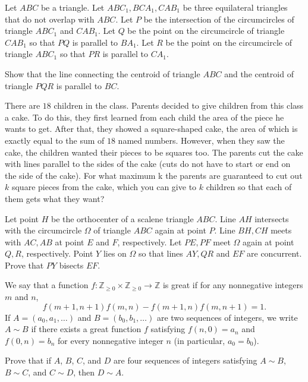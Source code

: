 \documentclass[11pt]{scrartcl}
\begin{document}
\begin{problem}[748616641641895]
Let $ABC$ be a triangle. Let $ABC_1, BCA_1, CAB_1$ be three equilateral triangles that do not overlap with $ABC$.
Let $P$ be the intersection of the circumcircles of triangle $ABC_1$ and $CAB_1$.
Let $Q$ be the point on the circumcircle of triangle $CAB_1$ so that $PQ$ is parallel to $BA_1$. Let $R$ be the point on the circumcircle of triangle $ABC_1$ so that $PR$ is parallel to $CA_1$.

Show that the line connecting the centroid of triangle $ABC$ and the centroid of triangle $PQR$ is parallel to $BC$.
\end{problem}
\begin{problem}[208479683430579745]
	There are $18$ children in the class. Parents decided to give children from this class a cake. To do this, they first learned from each child the area of the piece he wants to get. After that, they showed a square-shaped cake, the area of which is exactly equal to the sum of $18$ named numbers. However, when they saw the cake, the children wanted their pieces to be squares too. The parents cut the cake with lines parallel to the sides of the cake (cuts do not have to start or end on the side of the cake). For what maximum k the parents are guaranteed to cut out $k$ square pieces from the cake, which you can give to $k$ children so that each of them gets what they want?
\end{problem}
\begin{problem}[844684477828422]
Let point $H$ be the orthocenter of a scalene triangle $ABC$. Line $AH$ intersects with the circumcircle $\Omega$ of triangle $ABC$ again at point $P$. Line $BH, CH$ meets with $AC,AB$ at point $E$ and $F$, respectively. Let $PE, PF$ meet $\Omega$ again at point $Q,R$, respectively. Point $Y$ lies on $\Omega$ so that lines $AY,QR$ and $EF$ are concurrent. Prove that $PY$ bisects $EF$.
\end{problem}
\begin{problem}[2667130530962382147]
	We say that a function $f: \mathbb{Z}_{\ge 0} \times \mathbb{Z}_{\ge 0} \to \mathbb{Z}$ is great if for any nonnegative integers $m$ and $n$,
\[f(m + 1, n + 1) f(m, n) - f(m + 1, n) f(m, n + 1) = 1.\]If $A = (a_0, a_1, \dots)$ and $B = (b_0, b_1, \dots)$ are two sequences of integers, we write $A \sim B$ if there exists a great function $f$ satisfying $f(n, 0) = a_n$ and $f(0, n) = b_n$ for every nonnegative integer $n$ (in particular, $a_0 = b_0$).

Prove that if $A$, $B$, $C$, and $D$ are four sequences of integers satisfying $A \sim B$, $B \sim C$, and $C \sim D$, then $D \sim A$.
\end{problem}
\end{document}
